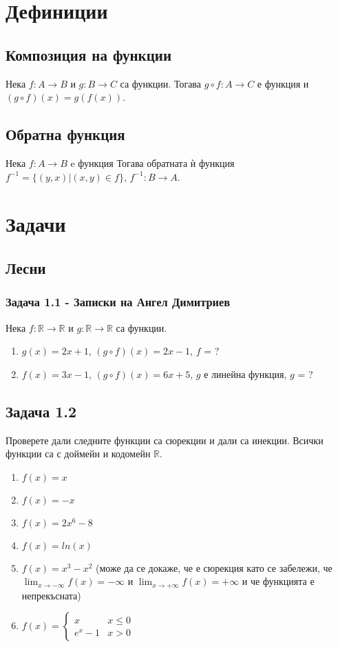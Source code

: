 \documentclass[12pt]{article}
\begin{document}
\section*{Дефиниции}
\subsection*{Композиция на функции}
Нека $f: A \rightarrow B$ и $g: B \rightarrow C$ са функции. Тогава $g \circ f: A \rightarrow C$ е функция и $(g \circ f)(x) = g(f(x))$.
\subsection*{Обратна функция}
Нека $f: A \rightarrow B$ e функция Тогава обратната ѝ функция $f^{-1} = \{ (y, x) | (x, y) \in f \}$, $f^{-1}: B \rightarrow A$.

\section*{Задачи}

\subsection*{Лесни}
\subsubsection*{Задача 1.1 - Записки на Ангел Димитриев}
Нека $f: \mathbb{R} \rightarrow \mathbb{R}$ и $g: \mathbb{R} \rightarrow \mathbb{R}$ са функции. 
\begin{enumerate}[label=\Alph*)]
    \item $g(x) = 2x + 1$, $(g \circ f)(x) = 2x - 1$, $f$ = ?
    \item $f(x) = 3x - 1$, $(g \circ f)(x) = 6x + 5$, $g$ е линейна функция, $g$ = ?
\end{enumerate}

\subsection*{Задача 1.2}
Проверете дали следните функции са сюрекции и дали са инекции. Всички функции са с доймейн и кодомейн $\mathbb{R}$.
\begin{enumerate}[label=\Alph*)]
    \item $f(x) = x$
    \item $f(x) = -x$
    \item $f(x) = 2x^6 - 8$
    \item $f(x) = ln(x)$
    \item $f(x) = x^3 - x^2$ (може да се докаже, че е сюрекция като се забележи, че $\displaystyle\lim_{x \rightarrow -\infty} f(x) = -\infty$ и $\displaystyle\lim_{x \rightarrow +\infty} f(x) = +\infty$ и че функцията е непрекъсната)
    \item $f(x) = \begin{cases}
        x & x \leq 0 \\
        e^x - 1 & x > 0
    \end{cases}$
\end{enumerate}
\end{document}
